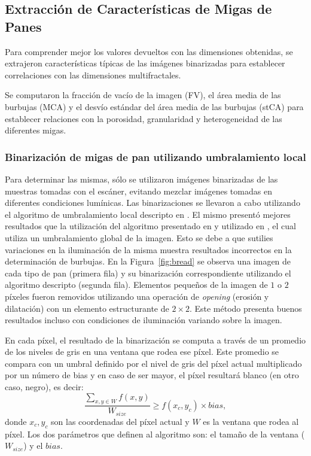 \documentclass[spanish,a4paper,11pt,oneside,links]{report}
\begin{document}
\subsection{Extracción de Características de Migas de Panes}
Para comprender mejor los valores devueltos con las dimensiones obtenidas, se extrajeron características típicas de las imágenes binarizadas para establecer correlaciones con las dimensiones multifractales.

Se computaron la fracción de vacío de la imagen (FV), el área media de las burbujas (MCA) y el desvío estándar del área media de las burbujas (stCA) para establecer relaciones con la porosidad, granularidad y heterogeneidad de las diferentes migas.

\subsubsection{Binarización de migas de pan utilizando umbralamiento local}
Para determinar las mismas, sólo se utilizaron imágenes binarizadas de las muestras tomadas con el escáner, evitando mezclar imágenes tomadas en diferentes condiciones lumínicas. Las binarizaciones se llevaron a cabo utilizando el algoritmo de umbralamiento local descripto en \cite{White83}. El mismo presentó mejores resultados que la utilización del algoritmo presentado en \cite{Huang95} y utilizado en \cite{Gonzales2008}, el cual utiliza un umbralamiento global de la imagen. Esto se debe a que sutilies variaciones en la iluminación de la misma muestra resultados incorrectos en la determinación de burbujas. En la Figura~\ref{fig:bread} se observa una imagen de cada tipo de pan (primera fila) y su binarización correspondiente utilizando el algoritmo descripto (segunda fila). Elementos pequeños de la imagen de $1$ o $2$ píxeles fueron removidos utilizando una operación de {\em opening} (erosión y dilatación) con un elemento estructurante de $2\times 2$. Este método presenta buenos resultados incluso con condiciones de iluminación variando sobre la imagen.

En cada píxel, el resultado de la binarización se computa a través de un promedio de los niveles de gris en una ventana que rodea ese píxel. Este promedio se compara con un umbral definido por el nivel de gris del píxel actual multiplicado por un número de bias y en caso de ser mayor, el píxel resultará blanco (en otro caso, negro), es decir:
\begin{equation}
\frac{\sum_{x,y \in W} f(x,y) }{W_{size}} \geq f(x_{c},y_{c}) \times bias,
\label{eqn:white}
\end{equation}
donde $x_{c},y_{c}$ son las coordenadas del píxel actual y  $W$ es la ventana que rodea al píxel. Los dos parámetros que definen al algoritmo son: el tamaño de la ventana ($W_{size}$) y el $bias$. 
\end{document}
